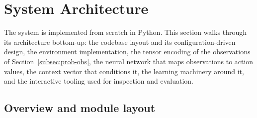 \section{System Architecture}
\label{sec:architecture}

The system is implemented from scratch in Python. This section walks through its
architecture bottom-up: the codebase layout and its configuration-driven design,
the environment implementation, the tensor encoding of the observations of
Section~\ref{subsec:prob-obs}, the neural network that maps observations to
action values, the context vector that conditions it, the learning machinery
around it, and the interactive tooling used for inspection and evaluation.

\subsection{Overview and module layout}
\label{subsec:arch-overview}


